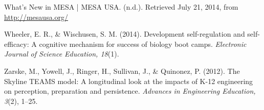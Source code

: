 \documentclass[11pt]{article}
\begin{document}
\begin{thebibliography}{99}
What’s New in MESA | MESA USA. (n.d.). Retrieved July 21, 2014, from \url{http://mesausa.org/}

Wheeler, E. R., \& Wischusen, S. M. (2014). Development self-regulation and self-efficacy: A cognitive mechanism for success of biology boot camps. \textit{Electronic Journal of Science Education, 18}(1).

Zarske, M., Yowell, J., Ringer, H., Sullivan, J., \& Quinonez, P. (2012). The Skyline TEAMS model: A longitudinal look at the impacts of K-12 engineering on perception, preparation and persistence. \textit{Advances in Engineering Education, 3}(2), 1–25.

\end{thebibliography}
\end{document}
